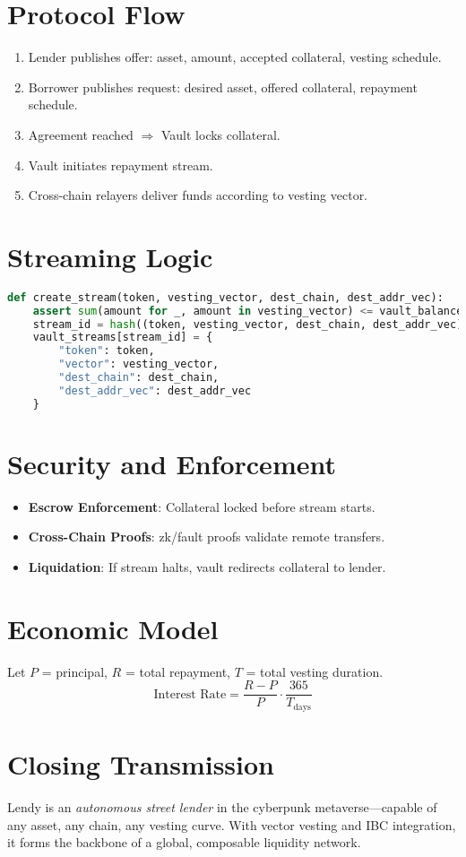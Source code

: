 \documentclass[11pt]{article}
\begin{document}
\section{Protocol Flow}
\begin{enumerate}[leftmargin=1.5em]
    \item Lender publishes offer: asset, amount, accepted collateral, vesting schedule.
    \item Borrower publishes request: desired asset, offered collateral, repayment schedule.
    \item Agreement reached $\Rightarrow$ Vault locks collateral.
    \item Vault initiates repayment stream.
    \item Cross-chain relayers deliver funds according to vesting vector.
\end{enumerate}

\section{Streaming Logic}
\begin{lstlisting}[language=Python]
def create_stream(token, vesting_vector, dest_chain, dest_addr_vec):
    assert sum(amount for _, amount in vesting_vector) <= vault_balance[token]
    stream_id = hash((token, vesting_vector, dest_chain, dest_addr_vec))
    vault_streams[stream_id] = {
        "token": token,
        "vector": vesting_vector,
        "dest_chain": dest_chain,
        "dest_addr_vec": dest_addr_vec
    }
\end{lstlisting}

\section{Security and Enforcement}
\begin{itemize}[leftmargin=1.5em]
    \item \textbf{Escrow Enforcement}: Collateral locked before stream starts.
    \item \textbf{Cross-Chain Proofs}: zk/fault proofs validate remote transfers.
    \item \textbf{Liquidation}: If stream halts, vault redirects collateral to lender.
\end{itemize}

\section{Economic Model}
Let $P$ = principal, $R$ = total repayment, $T$ = total vesting duration.
\begin{equation}
\text{Interest Rate} = \frac{R - P}{P} \cdot \frac{365}{T_{\text{days}}}
\end{equation}

\section*{Closing Transmission}
Lendy is an \emph{autonomous street lender} in the cyberpunk metaverse—capable of any asset, any chain, any vesting curve. With vector vesting and IBC integration, it forms the backbone of a global, composable liquidity network.
\end{document}
